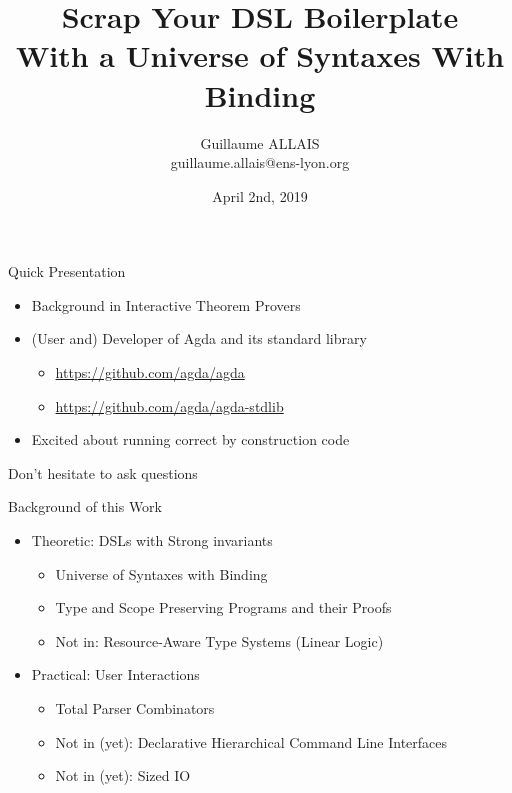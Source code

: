 \documentclass{beamer}
\begin{document}
\author{Guillaume ALLAIS
       \\ guillaume.allais@ens-lyon.org}
\title{Scrap Your DSL Boilerplate\\
With a Universe of Syntaxes With Binding}
\date{April 2nd, 2019}

\begin{frame}
\maketitle
\end{frame}

\begin{frame}{Quick Presentation}
\begin{itemize}
  \item Background in Interactive Theorem Provers
  \item (User and) Developer of Agda and its standard library
    \begin{itemize}
      \item \url{https://github.com/agda/agda}
      \item \url{https://github.com/agda/agda-stdlib}
    \end{itemize}
  \item Excited about running correct by construction code
\end{itemize}
\end{frame}

\begin{frame}{Don't hesitate to ask questions}
\end{frame}

\begin{frame}{Background of this Work}

\begin{itemize}
  \item Theoretic: DSLs with Strong invariants
    {
    \begin{itemize}
      \item Universe of Syntaxes with Binding
      \item Type and Scope Preserving Programs and their Proofs
      \item Not in: Resource-Aware Type Systems (Linear Logic)
    \end{itemize}
    }
  \medskip
  \item Practical: User Interactions
    {
    \begin{itemize}
      \item Total Parser Combinators
      \item Not in (yet): Declarative Hierarchical Command Line Interfaces
      \item Not in (yet): Sized IO
    \end{itemize}
    }
\end{itemize}
\end{frame}
\end{document}
